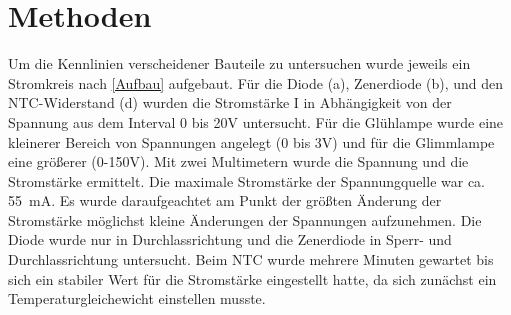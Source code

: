 \documentclass[
	a4paper,
	12pt,
	pagesize,
	ngerman
]{scrartcl}
\begin{document}
	\section{Methoden}
	Um die Kennlinien verscheidener Bauteile zu untersuchen wurde jeweils ein Stromkreis nach \cref{Aufbau} aufgebaut.
	Für die Diode (a), Zenerdiode (b), und den NTC-Widerstand (d) wurden die Stromstärke I in Abhängigkeit von der Spannung aus dem Interval 0 bis 20V untersucht. 
	Für die Glühlampe wurde eine kleinerer Bereich von Spannungen angelegt (0 bis 3V) und für die Glimmlampe eine größerer (0-150V).
	Mit zwei Multimetern wurde die Spannung und die Stromstärke ermittelt.
	Die maximale Stromstärke der Spannungquelle war ca. \SI{55}{mA}.
	Es wurde daraufgeachtet am Punkt der größten Änderung der Stromstärke möglichst kleine Änderungen der Spannungen aufzunehmen.
	Die Diode wurde nur in Durchlassrichtung und die Zenerdiode in Sperr- und Durchlassrichtung untersucht.
	Beim NTC wurde mehrere Minuten gewartet bis sich ein stabiler Wert für die Stromstärke eingestellt hatte, da sich zunächst ein Temperaturgleichewicht einstellen musste.
\end{document}

